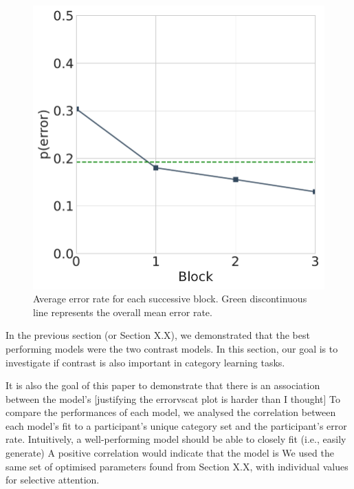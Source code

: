 \begin{figure}
    \begin{center}
    \includegraphics[width=\textwidth/2]{figs/e3-learningcurve.pdf}
    \caption{Average error rate for each successive block. Green discontinuous
      line represents the overall mean error rate.}
    \label{fig:learningcurve}
    \end{center}
\end{figure}

In the previous section (or Section X.X), we demonstrated that the best
performing models were the two contrast models. In this section, our goal is to
investigate if contrast is also important in category learning tasks.

It is also the
goal of this paper to demonstrate that there is an association between the
model's [justifying the errorvscat plot is harder than I thought] To compare the
performances of each model, we analysed the correlation between each model's fit
to a participant's unique category set and the participant's error rate.
Intuitively, a well-performing model should be able to closely fit (i.e., easily
generate) A positive correlation would indicate that the model is We used the
same set of optimised parameters found from Section X.X, with individual values
for selective attention.


